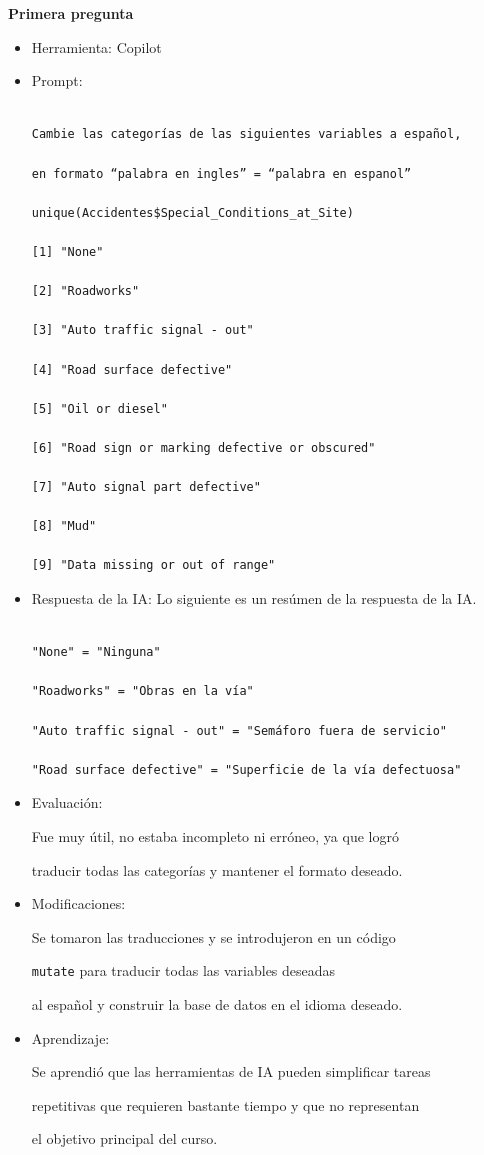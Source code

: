 \documentclass[12pt]{article}
\begin{document}
\textbf{Primera pregunta}
\begin{itemize}
    \item Herramienta: Copilot

    \item Prompt:
\begin{verbatim}

Cambie las categorías de las siguientes variables a español,

en formato “palabra en ingles” = “palabra en espanol”

unique(Accidentes$Special_Conditions_at_Site)

[1] "None"

[2] "Roadworks"

[3] "Auto traffic signal - out"

[4] "Road surface defective"

[5] "Oil or diesel"

[6] "Road sign or marking defective or obscured"

[7] "Auto signal part defective"

[8] "Mud"

[9] "Data missing or out of range"

\end{verbatim}

    \item Respuesta de la IA: Lo siguiente es un resúmen de la respuesta de la IA.

\begin{verbatim}

"None" = "Ninguna"

"Roadworks" = "Obras en la vía"

"Auto traffic signal - out" = "Semáforo fuera de servicio"

"Road surface defective" = "Superficie de la vía defectuosa"

\end{verbatim}

    \item Evaluación:

    Fue muy útil, no estaba incompleto ni erróneo, ya que logró

    traducir todas las categorías y mantener el formato deseado.

    \item Modificaciones:

    Se tomaron las traducciones y se introdujeron en un código

    \texttt{mutate} para traducir todas las variables deseadas

    al español y construir la base de datos en el idioma deseado.

    \item Aprendizaje:

    Se aprendió que las herramientas de IA pueden simplificar tareas

    repetitivas que requieren bastante tiempo y que no representan

    el objetivo principal del curso.

\end{itemize}
\end{document}
